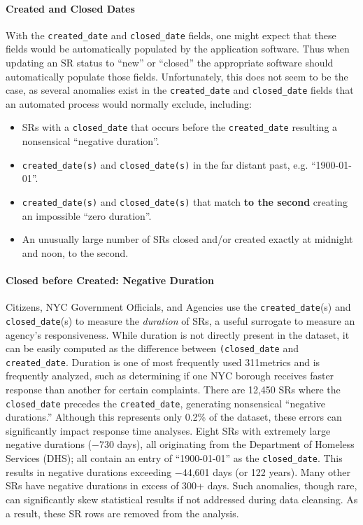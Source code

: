 \documentclass[linenumber]{jdsart}
\begin{document}
\paragraph{Created and Closed Dates}
\label{sec:negativeduration}
With the \texttt{created\_date} and \texttt{closed\_date} fields, one 
might expect that these fields would be automatically populated by the  
application software. Thus when updating an SR status to ``new'' or ``closed''
the appropriate software should automatically populate those fields. 
Unfortunately, this does not seem to be the case, as several anomalies 
exist in the \texttt{created\_date} and \texttt{closed\_date} fields that
an automated process would normally exclude, including:

\begin{itemize}[left=1.5em]
    \item SRs with a \texttt{closed\_date} that occurs before the 
    \texttt{created\_date} resulting a nonsensical ``negative duration''.
    \item \texttt{created\_date(s)} and \texttt{closed\_date(s)} in 
    the far distant past, e.g. ``1900-01-01''.
    \item \texttt{created\_date(s)} and \texttt{closed\_date(s)} that 
    match \textbf{to the second} creating an impossible ``zero duration''.
    \item An unusually large number of SRs closed and/or created exactly at midnight 
    and noon, to the second.
\end{itemize}


\paragraph{Closed before Created: Negative Duration}
Citizens, NYC Government Officials, and Agencies use the \texttt{created\_date}(s) and 
\texttt{closed\_date}(s) to measure the \textit{duration} of SRs, 
a useful surrogate to measure an agency's responsiveness. 
While duration is not directly present in the dataset, 
it can be easily computed as the difference between
\texttt{(closed\_date} and \texttt{created\_date}.  Duration is one of 
most frequently used 311metrics and is frequently analyzed, such as determining if 
one NYC borough receives faster response than another for certain 
complaints. There are 12,450 SRs where the \texttt{closed\_date} precedes the 
\texttt{created\_date}, generating nonsensical ``negative durations.'' 
Although this represents only 0.2\% of the dataset, these errors can 
significantly impact response time analyses. Eight SRs with extremely 
large negative durations ($-$730 days), all originating from the 
Department of Homeless Services (DHS); all contain an entry 
of ``1900-01-01'' as the \texttt{closed\_date}. This results 
in negative durations exceeding $-$44,601 days (or 122 years). Many
other SRs have negative durations in excess of 300+ days. Such 
anomalies, though rare, can significantly skew statistical results if 
not addressed during data cleansing. As a result, these SR rows are 
removed from the analysis. 
\end{document}
